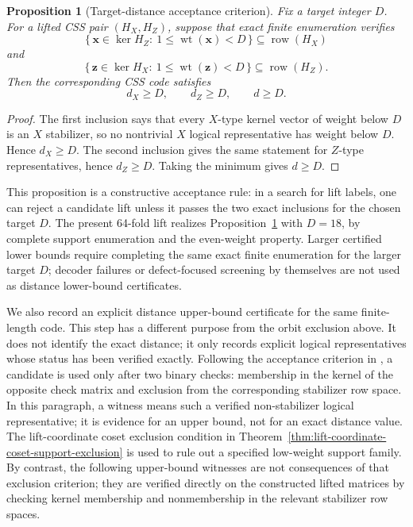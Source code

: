 \documentclass[11pt,a4paper]{article}
\newcommand{\HX}{H_X}
\newcommand{\HZ}{H_Z}
\newcommand{\vect}[1]{\bm{#1}}
\newcommand{\wt}{\operatorname{wt}}
\newcommand{\row}{\operatorname{row}}
\newcommand{\kerop}{\operatorname{ker}}
\theoremstyle{uprighttheorem}
\newtheorem{proposition}{Proposition}
\begin{document}
\begin{proposition}[Target-distance acceptance criterion]\label{prop:target-distance-acceptance}
Fix a target integer \(D\).
For a lifted CSS pair \((\HX,\HZ)\), suppose that exact finite enumeration verifies
\[
  \{\,\vect{x}\in\kerop \HZ:\ 1\le \wt(\vect{x})<D\,\}
  \subseteq \row(\HX)
\]
and
\[
  \{\,\vect{z}\in\kerop \HX:\ 1\le \wt(\vect{z})<D\,\}
  \subseteq \row(\HZ).
\]
Then the corresponding CSS code satisfies
\[
  d_X\ge D,\qquad d_Z\ge D,\qquad d\ge D.
\]
\end{proposition}

\begin{proof}
The first inclusion says that every $X$-type kernel vector of weight below \(D\) is an $X$ stabilizer, so no nontrivial $X$ logical representative has weight below \(D\).
Hence \(d_X\ge D\).
The second inclusion gives the same statement for $Z$-type representatives, hence \(d_Z\ge D\).
Taking the minimum gives \(d\ge D\).
\end{proof}

This proposition is a constructive acceptance rule: in a search for lift labels, one can reject a candidate lift unless it passes the two exact inclusions for the chosen target \(D\).
The present 64-fold lift realizes Proposition~\ref{prop:target-distance-acceptance} with $D=18$, by complete support enumeration and the even-weight property.
Larger certified lower bounds require completing the same exact finite enumeration for the larger target \(D\); decoder failures or defect-focused screening by themselves are not used as distance lower-bound certificates.

We also record an explicit distance upper-bound certificate for the same finite-length code.
This step has a different purpose from the orbit exclusion above.
It does not identify the exact distance; it only records explicit logical representatives whose status has been verified exactly.
Following the acceptance criterion in \cite{kasai2026heuristic}, a candidate is used only after two binary checks: membership in the kernel of the opposite check matrix and exclusion from the corresponding stabilizer row space.
In this paragraph, a witness means such a verified non-stabilizer logical representative; it is evidence for an upper bound, not for an exact distance value.
The lift-coordinate coset exclusion condition in Theorem~\ref{thm:lift-coordinate-coset-support-exclusion} is used to rule out a specified low-weight support family.
By contrast, the following upper-bound witnesses are not consequences of that exclusion criterion; they are verified directly on the constructed lifted matrices by checking kernel membership and nonmembership in the relevant stabilizer row spaces.
\end{document}
